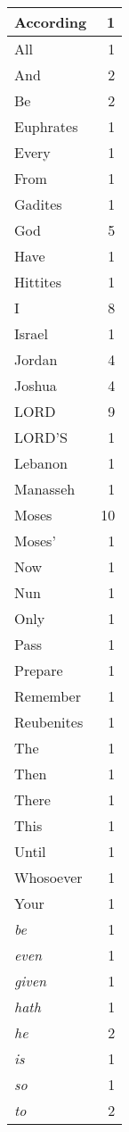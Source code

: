 \begin{center}
\begin{longtable}{l|r}
\hline \hline
\endlastfoot
According & 1 \\ \hline
All & 1 \\ \hline
And & 2 \\ \hline
Be & 2 \\ \hline
Euphrates & 1 \\ \hline
Every & 1 \\ \hline
From & 1 \\ \hline
Gadites & 1 \\ \hline
God & 5 \\ \hline
Have & 1 \\ \hline
Hittites & 1 \\ \hline
I & 8 \\ \hline
Israel & 1 \\ \hline
Jordan & 4 \\ \hline
Joshua & 4 \\ \hline
LORD & 9 \\ \hline
LORD'S & 1 \\ \hline
Lebanon & 1 \\ \hline
Manasseh & 1 \\ \hline
Moses & 10 \\ \hline
Moses' & 1 \\ \hline
Now & 1 \\ \hline
Nun & 1 \\ \hline
Only & 1 \\ \hline
Pass & 1 \\ \hline
Prepare & 1 \\ \hline
Remember & 1 \\ \hline
Reubenites & 1 \\ \hline
The & 1 \\ \hline
Then & 1 \\ \hline
There & 1 \\ \hline
This & 1 \\ \hline
Until & 1 \\ \hline
Whosoever & 1 \\ \hline
Your & 1 \\ \hline
\emph{be} & 1 \\ \hline
\emph{even} & 1 \\ \hline
\emph{given} & 1 \\ \hline
\emph{hath} & 1 \\ \hline
\emph{he} & 2 \\ \hline
\emph{is} & 1 \\ \hline
\emph{so} & 1 \\ \hline
\emph{to} & 2 \\ \hline

\end{longtable}
\end{center}
